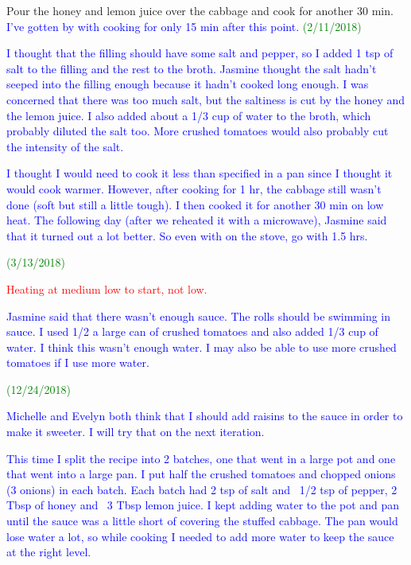 \documentclass[11pt]{article}
\begin{document}
Pour the honey and lemon juice over the cabbage and cook for another 30 min. \textcolor{blue}{I've gotten by with cooking for only 15 min after this point.} \textcolor{green}{(2/11/2018)}

\textcolor{blue}{I thought that the filling should have some salt and pepper, so I added 1 tsp of salt to the filling and the rest to the broth.  Jasmine thought the salt hadn't seeped into the filling enough because it hadn't cooked long enough.  I was concerned that there was too much salt, but the saltiness is cut by the honey and the lemon juice.  I also added about a 1/3 cup of water to the broth, which probably diluted the salt too.  More crushed tomatoes would also probably cut the intensity of the salt.}

\textcolor{blue}{I thought I would need to cook it less than specified in a pan since I thought it would cook warmer.  However, after cooking for 1 hr, the cabbage still wasn't done (soft but still a little tough).  I then cooked it for another 30 min on low heat.  The following day (after we reheated it with a microwave), Jasmine said that it turned out a lot better.  So even with on the stove, go with 1.5 hrs.  }

\textcolor{green}{(3/13/2018)}

\textcolor{red}{Heating at medium low to start, not low.}

\textcolor{blue}{Jasmine said that there wasn't enough sauce.  The rolls should be swimming in sauce.  I used 1/2 a large can of crushed tomatoes and also added 1/3 cup of water.  I think this wasn't enough water.  I may also be able to use more crushed tomatoes if I use more water.}

\textcolor{green}{(12/24/2018)}

\textcolor{blue}{Michelle and Evelyn both think that I should add raisins to the sauce in order to make it sweeter.  I will try that on the next iteration.}

\textcolor{blue}{This time I split the recipe into 2 batches, one that went in a large pot and one that went into a large pan.  I put half the crushed tomatoes and chopped onions (3 onions) in each batch.  Each batch had 2 tsp of salt and ~1/2 tsp of pepper, 2 Tbsp of honey and ~3 Tbsp lemon juice.  I kept adding water to the pot and pan until the sauce was a little short of covering the stuffed cabbage.  The pan would lose water a lot, so while cooking I needed to add more water to keep the sauce at the right level.}
\end{document}
